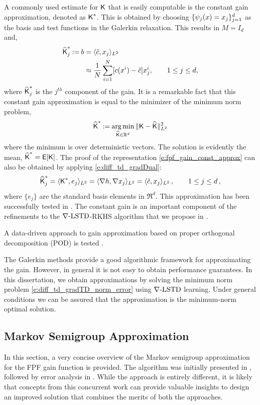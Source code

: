 A commonly used estimate for $\text{\sf K}$ that is easily computable is the constant gain approximation, denoted as $\text{\sf K}^*$. This is obtained by choosing $\{\psi_j(x) = x_j\}_{j=1}^d$ as the basis and test functions in the Galerkin relaxation. This results in  $M = I_{d}$ and,
\begin{align}
\hakFPF^*_j \eqdef b & = \langle \tilc , x_j \rangle_{L^2} \\ 
& \approx \frac{1}{N} \sum_{i=1}^N [ c(x^i) - \hac ]x^i_j, \qquad 1 \leq j \leq d,
\label{e:fpf_gain_const_approx}
\end{align}
where $\widehat{\text{\sf K}}^*_j$ is the $j^{th}$ component of the gain.
It is a remarkable fact that this constant gain approximation is equal to the minimizer of the minimum norm problem,  
  \begin{equation}
  \hakFPF^* \eqdef \argmin_{\hakFPF \in \Re^d} \| \kFPF - \hakFPF \|^2_{L^{2}}
  \label{e:fpf_const}
  \end{equation}
  where the minimum is over deterministic vectors. The solution is evidently the mean,  $\widehat{\text{\sf K}}^* = {\sf E}[\text{\sf K}]$.
The proof of the representation \eqref{e:fpf_gain_const_approx} can also be obtained by applying \eqref{e:diff_td_gradDual}: 
\[
\widehat{\text{\sf K}}^*_ j =  \langle \text{\sf K}^* ,e_j \rangle_{L^2}
=
\langle \nabla h, \nabla x_j \rangle_{L^2} =
\langle \tilde c ,x_j \rangle_{L^2}\,, \qquad 1\le j\le d\,,
\]
where $\{e_j\}$ are the standard basis elements in $\Re^d$. This approximation has been successfully tested in \cite{tilghiomeh13}. The constant gain is an important component of the refinements to the $\nabla\text{-LSTD}$-RKHS algorithm that we propose in .

A data-driven approach to gain approximation based on proper orthogonal decomposition (POD) is tested \cite{bergro16}.

The Galerkin methods provide a good algorithmic framework for approximating the gain. However, in general it is not easy to obtain performance guarantees. In this dissertation, we obtain approximations by solving  the minimum norm problem \eqref{e:diff_td_gradTD_norm_error} using $\nabla\text{-LSTD}$ learning.  Under general conditions we can be assured that the approximation is the minimum-norm optimal solution.   

\subsection{Markov Semigroup Approximation}
\label{s:coifman}
In this section, a very concise overview of the Markov semigroup approximation for the FPF gain function is provided. The algorithm was initially presented in \cite{tagmeh16}, followed by error analysis in \cite{tagmehmey17}. While the approach is entirely different, it is likely that concepts from this concurrent work can provide valuable insights to design an improved solution that combines the merits of both the approaches. 


